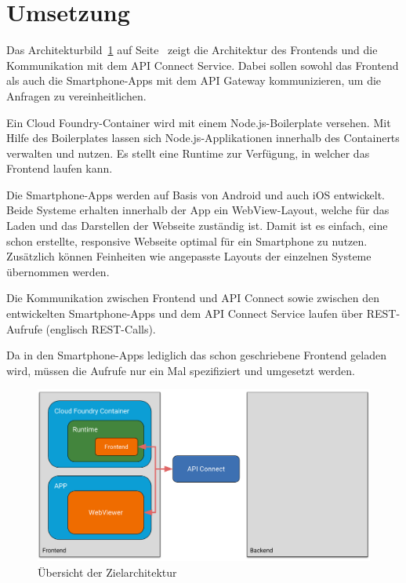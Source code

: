 \section{Umsetzung}
Das Architekturbild~\ref{fig:umsetzung_frontendarchitektur_4} auf Seite~\pageref{fig:umsetzung_frontendarchitektur_4}
zeigt die Architektur des Frontends und die Kommunikation mit dem API Connect Service. Dabei sollen sowohl das Frontend
als auch die Smartphone-Apps mit dem API Gateway kommunizieren, um die Anfragen zu vereinheitlichen.

Ein Cloud Foundry-Container wird mit einem Node.js-Boilerplate versehen. Mit Hilfe des Boilerplates lassen sich
Node.js-Applikationen innerhalb des Containerts verwalten und nutzen. Es stellt eine Runtime zur Verfügung, in welcher
das Frontend laufen kann.

Die Smartphone-Apps werden auf Basis von Android und auch iOS entwickelt. Beide Systeme erhalten innerhalb der App ein
WebView-Layout, welche für das Laden und das Darstellen der Webseite zuständig ist. Damit ist es einfach, eine schon
erstellte, responsive Webseite optimal für ein Smartphone zu nutzen. Zusätzlich können Feinheiten wie angepasste Layouts
der einzelnen Systeme übernommen werden.

Die Kommunikation zwischen Frontend und API Connect sowie zwischen den entwickelten Smartphone-Apps und dem API Connect
Service laufen über REST-Aufrufe (englisch REST-Calls).

Da in den Smartphone-Apps lediglich das schon geschriebene Frontend geladen wird, müssen die Aufrufe nur ein Mal
spezifiziert und umgesetzt werden.

\begin{figure}[h]
    \centering
    \includegraphics[width=\textwidth]{images/kapitel_4/architektur_frontend.pdf}
    \caption{Übersicht der Zielarchitektur}
    \label{fig:umsetzung_frontendarchitektur_4}
\end{figure}

